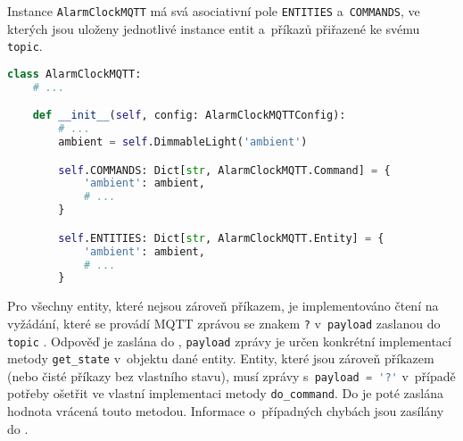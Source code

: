 Instance \texttt{AlarmClockMQTT} má svá asociativní pole
\texttt{ENTITIES} a~\texttt{COMMANDS}, ve kterých jsou uloženy jednotlivé
instance entit a~příkazů přiřazené ke svému \texttt{topic}.

\begin{lstlisting}[language=Python]
class AlarmClockMQTT:
    # ...

    def __init__(self, config: AlarmClockMQTTConfig):
        # ...
        ambient = self.DimmableLight('ambient')

        self.COMMANDS: Dict[str, AlarmClockMQTT.Command] = {
            'ambient': ambient,
            # ...
        }

        self.ENTITIES: Dict[str, AlarmClockMQTT.Entity] = {
            'ambient': ambient,
            # ...
        }
\end{lstlisting}

Pro všechny entity, které nejsou zároveň příkazem, je implementováno čtení na
vyžádání, které se provádí MQTT zprávou se znakem \texttt{?} v~\texttt{payload}
zaslanou do \texttt{topic} . Odpověď je
zaslána do , \texttt{payload} zprávy je
určen konkrétní implementací metody \verb|get_state| v~objektu dané entity.
Entity, které jsou zároveň příkazem (nebo čisté příkazy bez vlastního stavu),
musí zprávy s~\lstinline[language=Python]!payload = '?'! v~případě potřeby
ošetřit ve vlastní implementaci metody \verb|do_command|. Do
 je poté zaslána hodnota vrácená touto
metodou. Informace o~případných chybách jsou zasílány do
.

